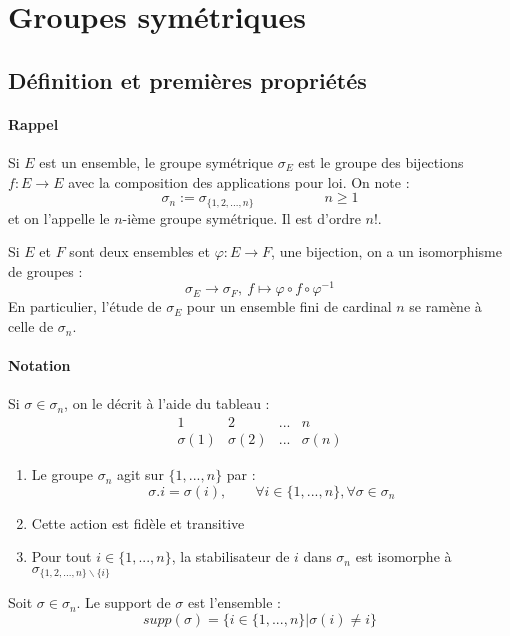 \documentclass[a4paper, oneside]{report}
\theoremstyle{break}
\begin{document}
\chapter{Groupes symétriques}

\section{Définition et premières propriétés}

\subsubsection{Rappel}
Si $E$ est un ensemble, le groupe symétrique $\sigma_E$ est le groupe des bijections $f:E\rightarrow E$ avec la composition des applications pour loi. On note :
$$\sigma_n := \sigma_{\{1,2,...,n \}} \hspace{5em} n\geq 1$$
et on l'appelle le $n$-ième groupe symétrique. Il est d'ordre $n!$.

\remar
Si $E$ et $F$ sont deux ensembles et $\varphi:E\rightarrow F$, une bijection, on a un isomorphisme de groupes :
$$\sigma_E \rightarrow \sigma_F,~f\mapsto \varphi\circ f \circ \varphi^{-1}$$
En particulier, l'étude de $\sigma_E$ pour un ensemble fini de cardinal $n$ se ramène à celle de $\sigma_n$.

\subsubsection{Notation}
Si $\sigma\in \sigma_n$, on le décrit à l'aide du tableau :
$$\begin{array}{llll}
1&2&...&n\\
\sigma(1)&\sigma(2)&...&\sigma(n)
\end{array}$$

\remar
\begin{enumerate}
\item Le groupe $\sigma_n$ agit sur $\{1,...,n\}$ par :
$$\sigma.i=\sigma(i), \hspace{2em} \forall i\in \{1,...,n\}, \forall \sigma \in \sigma_n$$

\item Cette action est fidèle et transitive

\item Pour tout $i\in \{1,...,n\}$, la stabilisateur de $i$ dans $\sigma_n$ est isomorphe à $\sigma_{\{1,2,...,n \}\backslash \{i\}}$
\end{enumerate}

Soit $\sigma \in \sigma_n$. Le support de $\sigma$ est l'ensemble :
$$supp(\sigma)=\{i\in \{1,...,n \} | \sigma(i)\neq i \}$$
\end{document}
